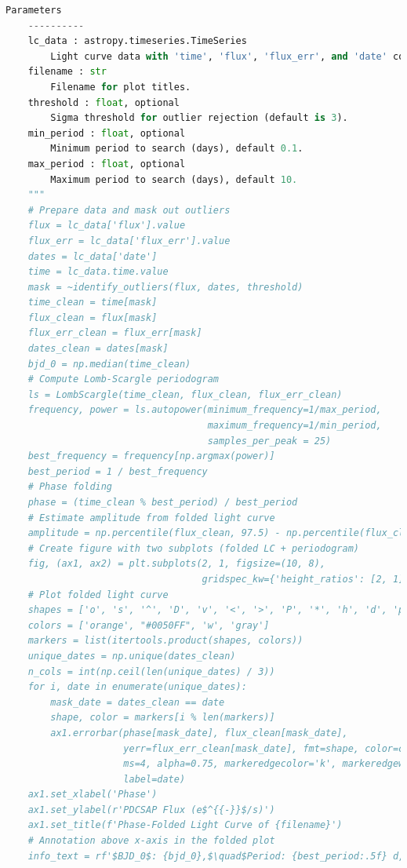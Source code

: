 \documentclass[a4paper,12pt]{article}
\newenvironment{solution}{}{}
\begin{document}
\begin{enumerate}
\begin{solution}
\begin{lstlisting}[language=python]
    Parameters
    ----------
    lc_data : astropy.timeseries.TimeSeries
        Light curve data with 'time', 'flux', 'flux_err', and 'date' columns.
    filename : str
        Filename for plot titles.
    threshold : float, optional
        Sigma threshold for outlier rejection (default is 3).
    min_period : float, optional
        Minimum period to search (days), default 0.1.
    max_period : float, optional
        Maximum period to search (days), default 10.
    """
    # Prepare data and mask out outliers
    flux = lc_data['flux'].value
    flux_err = lc_data['flux_err'].value
    dates = lc_data['date']
    time = lc_data.time.value
    mask = ~identify_outliers(flux, dates, threshold)
    time_clean = time[mask]
    flux_clean = flux[mask]
    flux_err_clean = flux_err[mask]
    dates_clean = dates[mask]
    bjd_0 = np.median(time_clean)
    # Compute Lomb-Scargle periodogram
    ls = LombScargle(time_clean, flux_clean, flux_err_clean)
    frequency, power = ls.autopower(minimum_frequency=1/max_period,
                                    maximum_frequency=1/min_period,
                                    samples_per_peak = 25)
    best_frequency = frequency[np.argmax(power)]
    best_period = 1 / best_frequency
    # Phase folding
    phase = (time_clean % best_period) / best_period
    # Estimate amplitude from folded light curve
    amplitude = np.percentile(flux_clean, 97.5) - np.percentile(flux_clean, 2.5)
    # Create figure with two subplots (folded LC + periodogram)
    fig, (ax1, ax2) = plt.subplots(2, 1, figsize=(10, 8),
                                   gridspec_kw={'height_ratios': [2, 1]})
    # Plot folded light curve
    shapes = ['o', 's', '^', 'D', 'v', '<', '>', 'P', '*', 'h', 'd', 'p']
    colors = ['orange', "#0050FF", 'w', 'gray']
    markers = list(itertools.product(shapes, colors))
    unique_dates = np.unique(dates_clean)
    n_cols = int(np.ceil(len(unique_dates) / 3))
    for i, date in enumerate(unique_dates):
        mask_date = dates_clean == date
        shape, color = markers[i % len(markers)]
        ax1.errorbar(phase[mask_date], flux_clean[mask_date],
                     yerr=flux_err_clean[mask_date], fmt=shape, color=color,
                     ms=4, alpha=0.75, markeredgecolor='k', markeredgewidth=0.5,
                     label=date)
    ax1.set_xlabel('Phase')
    ax1.set_ylabel(r'PDCSAP Flux (e$^{{-}}$/s)')
    ax1.set_title(f'Phase-Folded Light Curve of {filename}')
    # Annotation above x-axis in the folded plot
    info_text = rf'$BJD_0$: {bjd_0},$\quad$Period: {best_period:.5f} d,$\quad$Amplitude: $\sim${amplitude:.2f} e$^{{-}}$/s'

\end{lstlisting}
\end{solution}
\end{enumerate}
\end{document}
